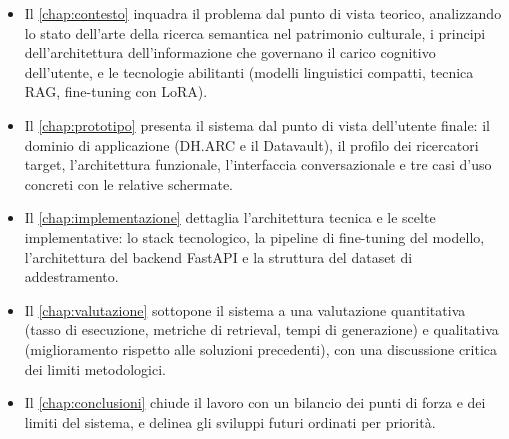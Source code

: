 \begin{itemize}
    \setlength{\itemsep}{0pt}
    \setlength{\parskip}{0pt}
    
    \item Il \cref{chap:contesto} inquadra il problema dal punto di vista teorico, analizzando lo stato dell'arte della ricerca semantica nel patrimonio culturale, i principi dell'architettura dell'informazione che governano il carico cognitivo dell'utente, e le tecnologie abilitanti (modelli linguistici compatti, tecnica RAG, fine-tuning con LoRA).
    
    \item Il \cref{chap:prototipo} presenta il sistema dal punto di vista dell'utente finale: il dominio di applicazione (DH.ARC e il Datavault), il profilo dei ricercatori target, l'architettura funzionale, l'interfaccia conversazionale e tre casi d'uso concreti con le relative schermate.
    
    \item Il \cref{chap:implementazione} dettaglia l'architettura tecnica e le scelte implementative: lo stack tecnologico, la pipeline di fine-tuning del modello, l'architettura del backend FastAPI e la struttura del dataset di addestramento.
    
    \item Il \cref{chap:valutazione} sottopone il sistema a una valutazione quantitativa (tasso di esecuzione, metriche di retrieval, tempi di generazione) e qualitativa (miglioramento rispetto alle soluzioni precedenti), con una discussione critica dei limiti metodologici.
    
    \item Il \cref{chap:conclusioni} chiude il lavoro con un bilancio dei punti di forza e dei limiti del sistema, e delinea gli sviluppi futuri ordinati per priorità.
\end{itemize}